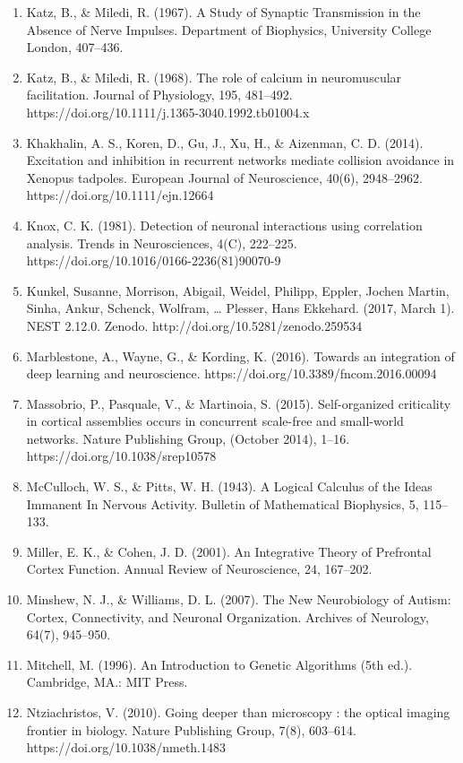 \documentclass[11pt,titlepage]{article}
\begin{document}
\begin{spacing}{1}
\begin{enumerate}
\item Katz, B., \& Miledi, R. (1967). A Study of Synaptic Transmission in the Absence of Nerve Impulses. Department of Biophysics, University College London, 407–436.
\item Katz, B., \& Miledi, R. (1968). The role of calcium in neuromuscular facilitation. Journal of Physiology, 195, 481–492. https://doi.org/10.1111/j.1365-3040.1992.tb01004.x
\item Khakhalin, A. S., Koren, D., Gu, J., Xu, H., \& Aizenman, C. D. (2014). Excitation and inhibition in recurrent networks mediate collision avoidance in Xenopus tadpoles. European Journal of Neuroscience, 40(6), 2948–2962. https://doi.org/10.1111/ejn.12664
\item Knox, C. K. (1981). Detection of neuronal interactions using correlation analysis. Trends in Neurosciences, 4(C), 222–225. https://doi.org/10.1016/0166-2236(81)90070-9
\item Kunkel, Susanne, Morrison, Abigail, Weidel, Philipp, Eppler, Jochen Martin, Sinha, Ankur, Schenck, Wolfram, … Plesser, Hans Ekkehard. (2017, March 1). NEST 2.12.0. Zenodo. http://doi.org/10.5281/zenodo.259534
\item Marblestone, A., Wayne, G., \& Kording, K. (2016). Towards an integration of deep learning and neuroscience. https://doi.org/10.3389/fncom.2016.00094
\item Massobrio, P., Pasquale, V., \& Martinoia, S. (2015). Self-organized criticality in cortical assemblies occurs in concurrent scale-free and small-world networks. Nature Publishing Group, (October 2014), 1–16. https://doi.org/10.1038/srep10578
\item McCulloch, W. S., \& Pitts, W. H. (1943). A Logical Calculus of the Ideas Immanent In Nervous Activity. Bulletin of Mathematical Biophysics, 5, 115–133.
\item Miller, E. K., \& Cohen, J. D. (2001). An Integrative Theory of Prefrontal Cortex Function. Annual Review of Neuroscience, 24, 167–202.
\item Minshew, N. J., \& Williams, D. L. (2007). The New Neurobiology of Autism: Cortex, Connectivity, and Neuronal Organization. Archives of Neurology, 64(7), 945–950.
\item Mitchell, M. (1996). An Introduction to Genetic Algorithms (5th ed.). Cambridge, MA.: MIT Press.
\item Ntziachristos, V. (2010). Going deeper than microscopy : the optical imaging frontier in biology. Nature Publishing Group, 7(8), 603–614. https://doi.org/10.1038/nmeth.1483

\end{enumerate}
\end{spacing}
\end{document}
